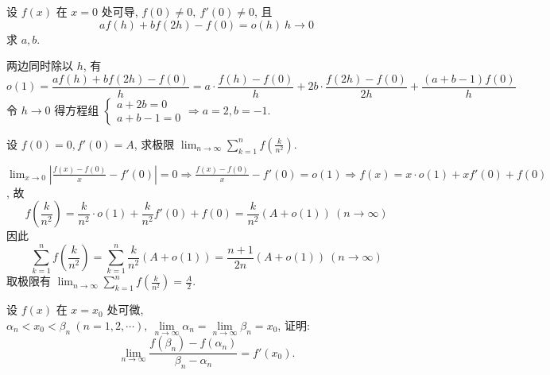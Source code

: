 \begin{example}
    设 $f(x)$ 在 $x=0$ 处可导, $f(0)\neq0,~f'(0)\neq 0$, 且 $$af(h)+bf(2h)-f(0)=o(h)~  h\to0$$
    求 $a,b.$
\end{example}
\begin{solution}
    两边同时除以 $h$, 有
    $$o(1)=\dfrac{af(h)+bf(2h)-f(0)}{h}=a\cdot\dfrac{f(h)-f(0)}{h}+2b\cdot\dfrac{f(2h)-f(0)}{2h}+\dfrac{(a+b-1)f(0)}{h}$$
    令 $h\to0$ 得方程组 $\begin{cases}
            a+2b=0 \\a+b-1=0
        \end{cases}\Rightarrow a=2,b=-1.$
\end{solution}

\begin{example}
    设 $f(0)=0,f'(0)=A$, 求极限 $\displaystyle\lim_{n\to\infty}\sum_{k=1}^{n}f\left(\frac{k}{n^2}\right).$
\end{example}
\begin{solution}
    $\displaystyle\lim_{x\to0}\left|\frac{f(x)-f(0)}{x}-f'(0)\right|=0\Rightarrow\frac{f(x)-f(0)}{x}-f'(0)=o(1)\Rightarrow f(x)=x\cdot o(1)+xf'(0)+f(0)$, 故
    $$f\left(\frac{k}{n^2}\right)=\frac{k}{n^2}\cdot o(1)+\frac{k}{n^2} f'(0)+f(0)=\frac{k}{n^2}(A+o(1))~  (n\to\infty)$$
    因此 $$\sum_{k=1}^{n}f\left(\frac{k}{n^2}\right)=\sum_{k=1}^{n}\frac{k}{n^2}(A+o(1))=\frac{n+1}{2n}(A+o(1))~  (n\to\infty)$$
    取极限有 $\displaystyle\lim_{n\to\infty}\sum_{k=1}^{n}f\left(\frac{k}{n^2}\right)=\frac{A}{2}.$
\end{solution}
\begin{example}
    设 $f(x)$ 在 $x=x_0$ 处可微, $\alpha_n<x_0<\beta_n~  (n=1,2,\cdots),~\lim\limits_{n\to\infty}\alpha_n=\lim\limits_{n\to\infty}\beta_n=x_0$, 
    证明: $$\lim\limits_{n\to\infty}\dfrac{f(\beta_n)-f(\alpha_n)}{\beta_n-\alpha_n}=f'(x_0).$$
\end{example}
